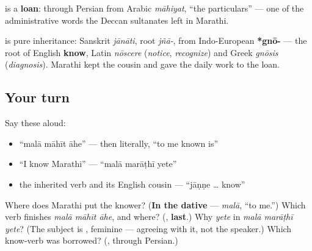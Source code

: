 \begin{cousinweb}
\textbf{} is a \textbf{loan}: through Persian from Arabic \emph{māhiyat}, \textquotedblleft{}the particulars\textquotedblright{} — one of the administrative words the Deccan sultanates left in Marathi.

\textbf{} is pure inheritance: Sanskrit \textbf{} \emph{jānāti}, root \emph{jñā-}, from Indo-European \textbf{*gnō-} — the root of English \textbf{know}, Latin \emph{nōscere} (\emph{notice}, \emph{recognize}) and Greek \emph{gnōsis} (\emph{diagnosis}). Marathi kept the cousin and gave the daily work to the loan.
\end{cousinweb}

\subsection*{Your turn}
Say these aloud:

\begin{itemize}
\raggedright
  \item \textquotedblleft{}malā māhīt āhe\textquotedblright{} — then literally, \textquotedblleft{}to me known is\textquotedblright{}
  \item \textquotedblleft{}I know Marathi\textquotedblright{} — \textquotedblleft{}malā marāṭhī yete\textquotedblright{}
  \item the inherited verb and its English cousin — \textquotedblleft{}jāṇṇe … know\textquotedblright{}
\end{itemize}

\begin{tcolorbox}[breakable,colback=teal!4,colframe=teal!35!black,title={Before you move on}]
Where does Marathi put the knower? (\textbf{In the dative} — \emph{malā}, \textquotedblleft{}to me.\textquotedblright{}) Which verb finishes \emph{malā māhīt āhe}, and where? (\textbf{}, \textbf{last}.) Why \emph{yete} in \emph{malā marāṭhī yete}? (The subject is \textbf{}, feminine — agreeing with it, not the speaker.) Which know-verb was borrowed? (\textbf{}, through Persian.)
\end{tcolorbox}
